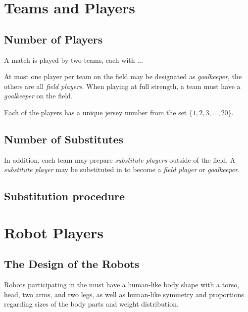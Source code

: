 \section{Teams and Players}
\label{sec:teams_and_players}

\subsection{Number of Players}
\label{sec:number_of_players}
A match is played by two teams, each with ...

At most one player per team on the field may be designated as \emph{goalkeeper}, the others are all \emph{field players}.
When playing at full strength, a team must have a \emph{goalkeeper} on the field.

Each of the players has a unique jersey number from the set $\{1, 2, 3, \ldots, 20\}$.
\subsection{Number of Substitutes}
\label{sec:number_of_substitutes}
In addition, each team may prepare \emph{substitute players} outside of the field.
A \emph{substitute player} may be substituted in to become a \emph{field player} or \emph{goalkeeper}.

\subsection{Substitution procedure}

\section{Robot Players}
\label{sec:robot_players}

\subsection{The Design of the Robots}
\label{sec:design_of_robots}
Robots participating in the \leaguenameabbr must have a human-like body shape with a torso, head, two arms, and two legs, as well as human-like symmetry and proportions regarding sizes of the body parts and weight distribution. 

